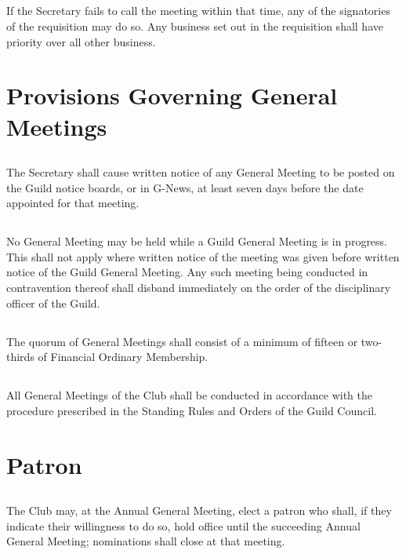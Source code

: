 \documentclass[10.5pt]{article}
\begin{document}
\subsection{}
If the Secretary fails to call the meeting within that time, any of the signatories of the requisition may do so. Any business set out in the requisition shall have priority over all other business. \newline


\section{Provisions Governing General Meetings}
\subsection{} The Secretary shall cause written notice of any General Meeting to be posted on the Guild notice boards, or in G-News, at least seven days before the date appointed for that meeting.
\subsection{} No General Meeting may be held while a Guild General Meeting is in progress. This shall not apply where written notice of the meeting was given before written notice of the Guild General Meeting. Any such meeting being conducted in contravention thereof shall disband immediately on the order of the disciplinary officer of the Guild.
\subsection{} The quorum of General Meetings shall consist of a minimum of fifteen or two-thirds of Financial Ordinary Membership.
\subsection{} All General Meetings of the Club shall be conducted in accordance with the procedure prescribed in the Standing Rules and Orders of the Guild Council.
\newline


\section{Patron}
\subsection{} The Club may, at the Annual General Meeting, elect a patron who shall, if they indicate their willingness to do so, hold office until the succeeding Annual General Meeting; nominations shall close at that meeting.
\newline
\end{document}
